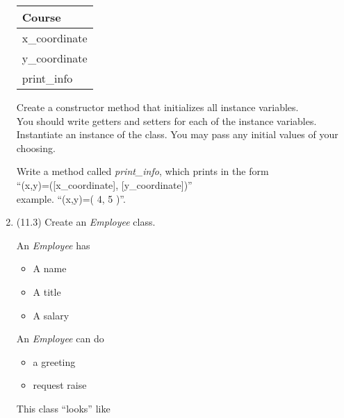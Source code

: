 \documentclass{article}
\newcommand{\tab}{\hspace*{0.25in}}
\begin{document}
\begin{enumerate}
\begin{minipage}{.4\textwidth}
		\vspace*{1em}
		\begin{tabular}{|l|}
			\hline Course\\ \hline
			x\_coordinate\\ y\_coordinate\\ \hline
			print\_info\\  \hline
		\end{tabular}
	\end{minipage}

	\vspace*{2ex}
	Create a constructor method that initializes all instance variables.\\
	You should write getters and setters for each of the instance variables.\\
	Instantiate an instance of the class. You may pass any initial values of your choosing.

	Write a method called \textit{print\_info}, which prints in the form \\
		\tab \tab \tab ``(x,y)=([x\_coordinate], [y\_coordinate])''\\
	example. ``(x,y)=( 4, 5 )''.\\





\item (11.3) Create an \textit{Employee} class.\\
	\begin{minipage}{.6\textwidth}		
		An \textit{Employee} has
		\begin{itemize}
			\item A name
			\item A title
			\item A salary	
		\end{itemize}
	
		An \textit{Employee} can do
		\begin{itemize}
			\item a greeting
			\item request raise
		\end{itemize}
	\end{minipage} 
	\begin{minipage}{.4\textwidth}
		This class ``looks'' like 
				

\end{minipage}
\end{enumerate}
\end{document}
